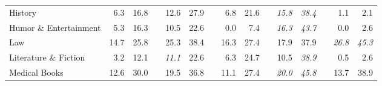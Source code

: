 \documentclass[12pt]{article}
\numberwithin{equation}{section}
\numberwithin{figure}{section}
\begin{document}
\begin{table}[]
{\begin{tabular}{lrrrrrrrrrrrrrr}
	History                        & 6.3                                & 16.8                               &                               & 12.6                               & 27.9                               &                               & 6.8                                & 21.6                               &                               & \textit{15.8}                      & \textit{38.4}                      &                               & 1.1                                & 2.1                                \\
	Humor \& Entertainment         & 5.3                                & 16.3                               &                               & 10.5                               & 22.6                               &                               & 0.0                                & 7.4                                &                               & \textit{16.3}                      & \textit{43.7}                      &                               & 0.0                                & 2.6                                \\
	Law                            & 14.7                               & 25.8                               &                               & 25.3                               & 38.4                               &                               & 16.3                               & 27.4                               &                               & 17.9                               & 37.9                               &                               & \textit{26.8}                      & \textit{45.3}                      \\
	Literature \& Fiction          & 3.2                                & 12.1                               &                               & \textit{11.1}                      & 22.6                               &                               & 6.3                                & 24.7                               &                               & 10.5                               & \textit{38.9}                      &                               & 0.5                                & 2.6                                \\
	Medical Books                  & 12.6                               & 30.0                               &                               & 19.5                               & 36.8                               &                               & 11.1                               & 27.4                               &                               & \textit{20.0}                      & \textit{45.8}                      &                               & 13.7                               & 38.9                               \\

\end{tabular}}
\end{table}
\end{document}
